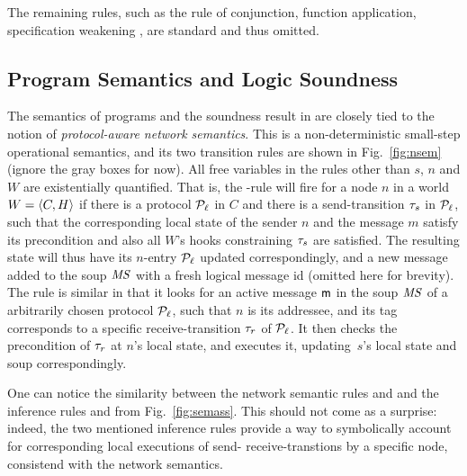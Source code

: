 The remaining rules, such as the rule of conjunction, function
application, specification weakening \etc, are standard and thus
omitted.



\subsection{Program Semantics and Logic Soundness}
\label{sec:soundness}


The semantics of programs and the soundness result in \disel are
closely tied to the notion of \emph{protocol-aware network semantics}.
%
This is a non-deterministic small-step operational semantics, and its
two transition rules are shown in Fig.~\ref{fig:nsem} (ignore the
gray boxes for now).
%
All free variables in the rules other than $s$, $n$ and $W$ are
existentially quantified. That is, the -rule will
fire for a node $n$ in a world $W = \langle{C, H}\rangle$ if there is a
protocol $\mathcal{P}_\ell$ in $C$ and there is a send-transition $\tau_s$
in $\mathcal{P}_{\ell}$, such that the corresponding local state of the
sender $n$ and the message $m$ satisfy its precondition and also all
$W$'s hooks constraining $\tau_s$ are satisfied. The resulting state
will thus have its $n$-entry \wrt $\mathcal{P}_{\ell}$ updated
correspondingly, and a new message added to the soup $\mathit{MS}$ with a
fresh logical message id (omitted here for brevity).
%
The rule  is similar in that it looks for an active
message $\mathsf{m}$ in the soup $\mathit{MS}$ of a arbitrarily chosen protocol
$\mathcal{P}_{\ell}$, such that $n$ is its addressee, and its tag corresponds
to a specific receive-transition $\tau_r$ of $\mathcal{P}_{\ell}$. It then
checks the precondition of $\tau_r$ at $n$'s local state, and
executes it, updating~$s$'s local state and soup correspondingly.

One can notice the similarity between the network semantic rules
 and  and the inference rules
 and  from
Fig.~\ref{fig:semass}. This should not come as a surprise: indeed, the
two mentioned inference rules provide a way to symbolically account
for corresponding local executions of send- receive-transtions by a
specific node, consistend with the network semantics.

